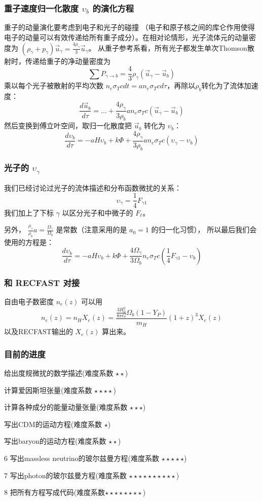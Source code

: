 \documentclass[CJK,13pt]{beamer}
\begin{document}
    
    \begin{frame}
      \frametitle{重子速度归一化散度 $\upsilon_b$ 的演化方程}
      重子的动量演化要考虑到电子和光子的碰撞 （电子和原子核之间的库仑作用使得电子的动量可以有效传递给所有重子成分）。在相对论情形，光子流体元的动量密度为 $(\rho_\gamma+p_\gamma)\vec{u}_\gamma=\frac{4\rho_\gamma}{3}\vec{u}_\gamma$。 从重子参考系看，所有光子都发生单次Thomson散射时，传递给重子的净动量密度为
      $$\sum P_{\gamma\rightarrow b} = \frac{4}{3}\rho_{\gamma}\left(\vec{u}_\gamma-\vec{u}_b\right)$$     
      乘以每个光子被散射的平均次数 $n_e\sigma_Tcdt = an_e\sigma_T c d\tau$，再除以$\rho_b$转化为了流体加速度：
      $$\frac{d\vec{u}_b}{d\tau} = \ldots + \frac{4\rho_{\gamma}}{3\rho_b}an_e\sigma_Tc\left(\vec{u}_\gamma-\vec{u}_b\right) $$
      然后变换到傅立叶空间，取归一化散度把 $\vec{u}_b$ 转化为 $\upsilon_b$：
       $$ \frac{d\upsilon_b}{d\tau} = -aH\upsilon_b  + k \Phi + \frac{4\rho_{\gamma}}{3\rho_b} an_e\sigma_Tc \left(\upsilon_\gamma-\upsilon_b\right)$$
    \end{frame}


    \begin{frame}
      \frametitle{光子的 $\upsilon_\gamma$}
      我们已经讨论过光子的流体描述和分布函数微扰的关系：
      $$\upsilon_\gamma = \frac{1}{4}F_{\gamma 1}$$
      我们加上了下标 $\gamma$ 以区分光子和中微子的 $F_\ell$。


      另外， $\frac{\rho_\gamma }{\rho_b} a = \frac{\Omega_{\gamma}}{\Omega_b}$ 是常数（注意采用的是 $a_0=1$ 的归一化习惯）， 
      所以最后我们会使用的方程是：
      {\blue $$ \frac{d\upsilon_b}{d\tau} = -aH\upsilon_b  + k \Phi + \frac{4\Omega_{\gamma}}{3\Omega_b} n_e\sigma_Tc \left(\frac{1}{4}F_{\gamma 1}-\upsilon_b\right)$$}
    \end{frame}


    \begin{frame}
      \frametitle{和 RECFAST 对接}
      自由电子数密度 $n_e(z)$ 可以用
      $$ n_e(z) = n_HX_e(z) = \frac{\frac{3H_0^2}{8\pi G}\Omega_b(1-Y_P)}{m_H}(1+z)^3 X_e(z) $$
      以及RECFAST输出的 $X_e(z)$ 算出来。
    \end{frame}
    
  \begin{frame}
    \frametitle{目前的进度}
    \bitem
  \item[\checkmark]{给出度规微扰的数学描述(难度系数 $\star\star$)}
  \item[\checkmark]{计算爱因斯坦张量(难度系数 $\star\star\star\star$)}
  \item[\checkmark]{计算各种成分的能量动量张量(难度系数 $\star\star\star$)}    
  \item[\checkmark]{写出CDM的运动方程(难度系数 $\star$)}
  \item[\checkmark]{写出baryon的运动方程(难度系数 $\star\star$)}        
  \item[6]{写出massless neutrino的玻尔兹曼方程(难度系数 $\star\star\star\star\star$)}
  \item[7]{写出photon的玻尔兹曼方程(难度系数 $\star\star\star\star\star\star\star\star\star\star$)}
  \item[8]{把所有方程写成代码(难度系数$\star\star\star\star\star\star\star\star$)}
    \eitem
  \end{frame}
\end{document}
